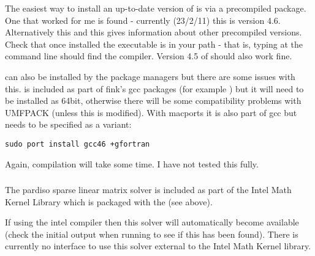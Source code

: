 
The easiest way to install an up-to-date version of  is via a precompiled package.  One that worked for me is found  - currently (23/2/11) this is version 4.6.  Alternatively this  and this  gives information about other precompiled versions.  Check that once installed the  executable is in your path - that is, typing  at the command line should find the compiler.  Version 4.5 of  should also work fine.


 can also be installed by the package managers but there are some issues with this.   is included as part of fink's gcc packages (for example ) but it will need to be installed as 64bit, otherwise there will be some compatibility problems with UMFPACK (unless this is modified).  With macports it is also part of gcc but needs to be specified as a variant:
%
\begin{verbatim}
sudo port install gcc46 +gfortran
\end{verbatim}
%
Again, compilation will take some time.  I have not tested this fully.

\subsubsection{ \label{sec:pardiso}}

The pardiso sparse linear matrix solver is included as part of the Intel Math Kernel Library which is packaged with the  (see above).

If using the intel compiler then this solver will automatically become available (check the initial output when running  to see if this has been found).  There is currently no interface to use this solver external to the Intel Math Kernel library.

\subsubsection{ \label{sec:umfpack}}

